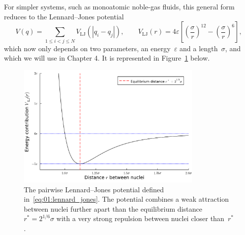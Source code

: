 For simpler systems, such as monoatomic noble-gas fluids, this general form reduces to the Lennard--Jones potential
\begin{equation}
    \label{eq:01:lennard_jones}
    V(q) = \sum_{1\leq i < j \leq N} V_{\mathrm{LJ}}\left(|q_i-q_j|\right),\qquad V_{\mathrm{LJ}}(r) = 4\varepsilon \left[\left(\frac{\sigma}{r}\right)^{12}-\left(\frac{\sigma}{r}\right)^6\right],
\end{equation}
which now only depends on two parameters, an energy~$\varepsilon$ and a length~$\sigma$, and which we will use in Chapter 4. It is represented in Figure~\ref{01:fig:lj} below.
\begin{figure}
    \centering
    \includegraphics[width=0.8\textwidth]{figures/01/lj.pdf}
    \caption[The Lennard--Jones pairwise potential]{The pairwise Lennard--Jones potential defined in~\eqref{eq:01:lennard_jones}. The potential combines a weak attraction between nuclei further apart than the equilibrium distance~$r^*=2^{1/6}\sigma$ with a very strong repulsion between nuclei closer than~$r^*$.}
    \label{01:fig:lj}
\end{figure}

